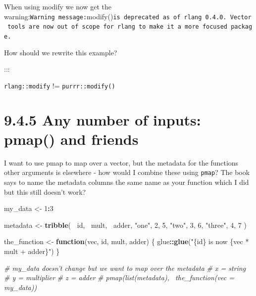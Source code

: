 \documentclass[]{book}
\newenvironment{Shaded}{\begin{snugshade}}{\end{snugshade}}
\newcommand{\CommentTok}[1]{\textcolor[rgb]{0.56,0.35,0.01}{\textit{#1}}}
\newcommand{\ControlFlowTok}[1]{\textcolor[rgb]{0.13,0.29,0.53}{\textbf{#1}}}
\newcommand{\DataTypeTok}[1]{\textcolor[rgb]{0.13,0.29,0.53}{#1}}
\newcommand{\DecValTok}[1]{\textcolor[rgb]{0.00,0.00,0.81}{#1}}
\newcommand{\KeywordTok}[1]{\textcolor[rgb]{0.13,0.29,0.53}{\textbf{#1}}}
\newcommand{\NormalTok}[1]{#1}
\newcommand{\OperatorTok}[1]{\textcolor[rgb]{0.81,0.36,0.00}{\textbf{#1}}}
\newcommand{\StringTok}[1]{\textcolor[rgb]{0.31,0.60,0.02}{#1}}
\begin{document}
When using modify we now get the warning:\texttt{Warning\ message:}modify()\texttt{is\ deprecated\ as\ of\ rlang\ 0.4.0.\ Vector\ tools\ are\ now\ out\ of\ scope\ for\ rlang\ to\ make\ it\ a\ more\ focused\ package.}

How should we rewrite this example?

\begin{Shaded}
\end{Shaded}

:::

\texttt{rlang::modify} != \texttt{purrr::modify()}

\hypertarget{any-number-of-inputs-pmap-and-friends}{%
\section*{9.4.5 Any number of inputs: pmap() and friends}\label{any-number-of-inputs-pmap-and-friends}}

I want to use pmap to map over a vector, but the metadata for the functions other arguments is elsewhere - how would I combine these using \texttt{pmap}? The book says to name the metadata columns the same name as your function which I did but this still doesn't work?

\begin{Shaded}
\begin{Highlighting}[]
\NormalTok{my_data <-}\StringTok{ }\DecValTok{1}\OperatorTok{:}\DecValTok{3}

\NormalTok{metadata <-}\StringTok{ }\KeywordTok{tribble}\NormalTok{(}
  \OperatorTok{~}\NormalTok{id, }\OperatorTok{~}\NormalTok{mult, }\OperatorTok{~}\NormalTok{adder,}
  \StringTok{"one"}\NormalTok{,   }\DecValTok{2}\NormalTok{,      }\DecValTok{5}\NormalTok{,}
  \StringTok{"two"}\NormalTok{,   }\DecValTok{3}\NormalTok{,      }\DecValTok{6}\NormalTok{,}
  \StringTok{"three"}\NormalTok{, }\DecValTok{4}\NormalTok{,      }\DecValTok{7}
\NormalTok{)}

\NormalTok{the_function <-}\StringTok{ }\ControlFlowTok{function}\NormalTok{(vec, id, mult, adder) \{}
\NormalTok{  glue}\OperatorTok{::}\KeywordTok{glue}\NormalTok{(}\StringTok{"\{id\} is now \{vec * mult + adder\}"}\NormalTok{)}
\NormalTok{\}}

\CommentTok{# my_data doesn't change but we want to map over the metadata}
\CommentTok{# x = string}
\CommentTok{# y = multiplier}
\CommentTok{# z = adder}
\CommentTok{# pmap(list(metadata), ~the_function(vec = my_data))}
\end{Highlighting}
\end{Shaded}
\end{document}
